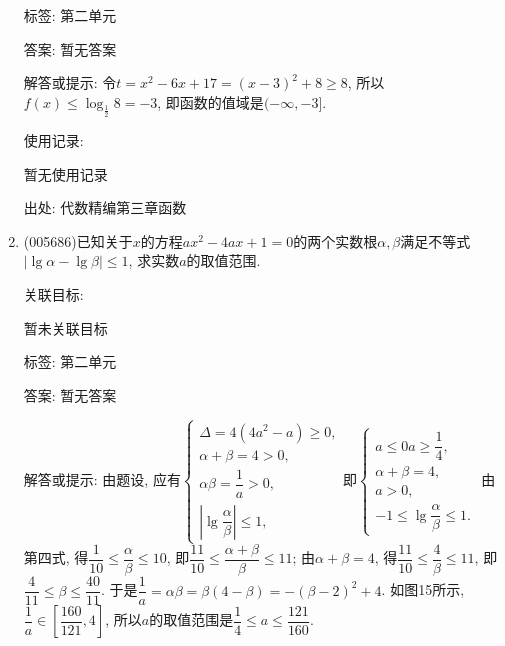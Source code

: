\documentclass[10pt,a4paper]{article}
\begin{document}
\begin{enumerate}[1.]
标签: 第二单元

答案: 暂无答案

解答或提示: 令$t=x^2-6x+17=(x-3)^2+8\ge 8$,
所以$ f(x)\le \log_{\frac 12}8=-3$, 即函数的值域是$(-\infty ,-3]$.

使用记录:

暂无使用记录


出处: 代数精编第三章函数
\item { (005686)}已知关于$x$的方程$ax^2-4ax+1=0$的两个实数根$\alpha ,\beta$满足不等式$|\lg \alpha -\lg \beta|\le 1$, 求实数$a$的取值范围.


关联目标:

暂未关联目标



标签: 第二单元

答案: 暂无答案

解答或提示: 由题设, 应有$\begin{cases} \Delta =4(4a^2-a)\ge 0, \\ \alpha +\beta =4>0, \\ \alpha \beta =\dfrac 1a>0, \\|\lg \dfrac{\alpha }{\beta }|\le 1, \end{cases}$即$\begin{cases} a\le 0a\ge \dfrac 14, \\ \alpha +\beta =4, \\ a>0, \\ -1\le \lg \dfrac{\alpha }{\beta }\le 1. \end{cases}$
由第四式, 得$\dfrac 1{10}\le \dfrac{\alpha }{\beta }\le 10$, 即$\dfrac{11}{10}\le \dfrac{\alpha +\beta }{\beta }\le 11$;
由$\alpha +\beta =4$, 得$\dfrac{11}{10}\le \dfrac 4{\beta }\le 11$, 即$\dfrac 4{11}\le \beta \le \dfrac{40}{11}$.
于是$\dfrac 1a=\alpha \beta =\beta (4-\beta)=-(\beta -2)^2+4$.
如图15所示, $\dfrac 1a\in [\dfrac{160}{121},4]$, 所以$a$的取值范围是$\dfrac 14\le a\le \dfrac{121}{160}$.
\begin{center}
\end{center}


\end{enumerate}
\end{document}
